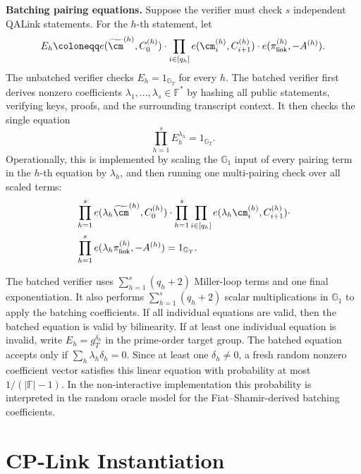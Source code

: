 \noindent\textbf{Batching pairing equations.}
Suppose the verifier must check \(s\) independent QALink statements.  For the
\(h\)-th statement, let
\[
  E_h
  \coloneqq
  e(\widetilde{\cm}^{(h)},C^{(h)}_0)
  \cdot
  \prod_{i\in[q_h]} e(\cm^{(h)}_i,C^{(h)}_{i+1})
  \cdot
  e(\pi^{(h)}_{\mathsf{link}},-A^{(h)}).
\]
The unbatched verifier checks \(E_h=1_{\mathbb{G}_T}\) for every \(h\).  The
batched verifier first derives nonzero coefficients
\(\lambda_1,\ldots,\lambda_s\in\mathbb{F}^{\ast}\) by hashing all public
statements, verifying keys, proofs, and the surrounding transcript context.  It
then checks the single equation
\[
  \prod_{h=1}^{s} E_h^{\lambda_h}=1_{\mathbb{G}_T}.
\]
Operationally, this is implemented by scaling the \(\mathbb{G}_1\) input of
every pairing term in the \(h\)-th equation by \(\lambda_h\), and then running
one multi-pairing check over all scaled terms:
\[
\begin{aligned}
  &\prod_{h=1}^{s}
  e(\lambda_h\widetilde{\cm}^{(h)},C^{(h)}_0)
  \cdot
  \prod_{h=1}^{s}\prod_{i\in[q_h]}
  e(\lambda_h\cm^{(h)}_i,C^{(h)}_{i+1})
  \cdot \\
  &\prod_{h=1}^{s}
  e(\lambda_h\pi^{(h)}_{\mathsf{link}},-A^{(h)})
  =
  1_{\mathbb{G}_T}.
\end{aligned}
\]

The batched verifier uses \(\sum_{h=1}^{s}(q_h+2)\) Miller-loop terms and one
final exponentiation.  It also performs \(\sum_{h=1}^{s}(q_h+2)\) scalar
multiplications in \(\mathbb{G}_1\) to apply the batching coefficients.  If all
individual equations are valid, then the batched equation is valid by
bilinearity.  If at least one individual equation is invalid, write
\(E_h=g_T^{\delta_h}\) in the prime-order target group.  The batched equation
accepts only if \(\sum_h \lambda_h\delta_h=0\).  Since at least one
\(\delta_h\neq 0\), a fresh random nonzero coefficient vector satisfies this
linear equation with probability at most \(1/(|\mathbb{F}|-1)\).  In the
non-interactive implementation this probability is interpreted in the random
oracle model for the Fiat--Shamir-derived batching coefficients.
\fi

\section{CP-Link Instantiation}
\label{app:cplink-instant}

